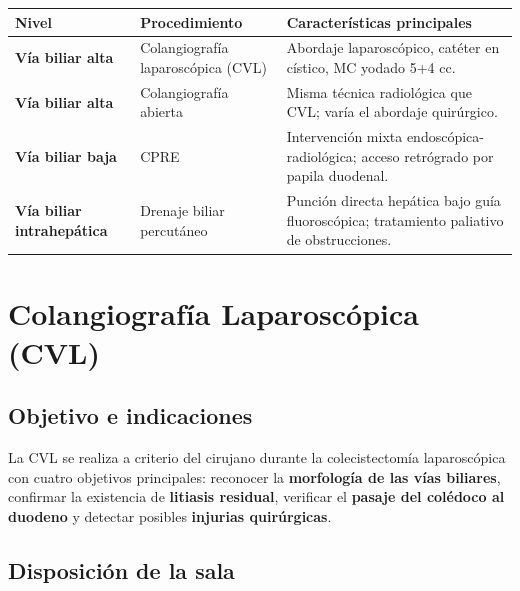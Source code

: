 {\renewcommand{\arraystretch}{1.35}
	\begin{center}
		\begin{tabular}{>{\bfseries}p{3.5cm} p{4.5cm} p{6cm}}
			\hline
			Nivel & Procedimiento & Características principales \\
			\hline
			Vía biliar alta & Colangiografía laparoscópica (CVL) & Abordaje laparoscópico, catéter en cístico, MC yodado 5+4 cc. \\[0.5em]
			\hline
			Vía biliar alta & Colangiografía abierta & Misma técnica radiológica que CVL; varía el abordaje quirúrgico. \\[0.5em]
			\hline
			Vía biliar baja & CPRE & Intervención mixta endoscópica-radiológica; acceso retrógrado por papila duodenal. \\[0.5em]
			\hline
			Vía biliar intra\-hepática & Drenaje biliar percutáneo & Punción directa hepática bajo guía fluoroscópica; tratamiento paliativo de obstrucciones. \\
			\hline
		\end{tabular}
	\end{center}
}
\section*{Colangiografía Laparoscópica (CVL)}

\subsection*{Objetivo e indicaciones}

La CVL se realiza a criterio del cirujano durante la colecistectomía laparoscópica con cuatro objetivos principales: reconocer la \textbf{morfología de las vías biliares}, confirmar la existencia de \textbf{litiasis residual}, verificar el \textbf{pasaje del colédoco al duodeno} y detectar posibles \textbf{injurias quirúrgicas}.

\subsection*{Disposición de la sala}

